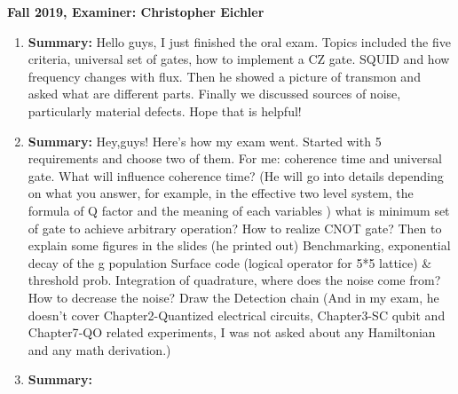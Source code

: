 \documentclass{article}%
\begin{document}
\newpage%
\begin{center}%
\begin{large}%
\textbf{Fall 2019, Examiner: Christopher Eichler}%
\end{large}%
\end{center}%
\begin{enumerate}%
\item%
\begin{mycolorbox}%
\textbf{Summary:}%
\newline%
Hello guys, I just finished the oral exam. Topics included the five criteria, universal set of gates, how to implement a CZ gate. SQUID and how frequency changes with flux. Then he showed a picture of transmon and asked what are different parts. Finally we discussed sources of noise, particularly material defects. Hope that is helpful!%
\end{mycolorbox}%
\item%
\textbf{Summary:}%
\newline%
Hey,guys! Here's how my exam went.\newline%
Started with 5 requirements and choose two of them.\newline%
For me: coherence time and universal gate.\newline%
What will influence coherence time? (He will go into details depending on what you answer, for example, in the effective two level system, the formula of Q factor and the meaning of each variables )\newline%
what is minimum set of gate to achieve arbitrary operation? \newline%
How to realize CNOT gate? \newline%
Then to explain some figures in the slides (he printed out)\newline%
Benchmarking, exponential decay of the g population\newline%
Surface code (logical operator for 5*5 lattice) \& threshold prob.\newline%
Integration of quadrature, where does the noise come from? How to decrease the noise? Draw the Detection chain\newline%
(And in my exam, he doesn't cover Chapter2{-}Quantized electrical circuits, Chapter3{-}SC qubit and Chapter7{-}QO related experiments, I was not asked about any Hamiltonian and any math derivation.)%
\item%
\begin{mycolorbox}%
\textbf{Summary:}%
\newline%

\end{mycolorbox}
\end{enumerate}
\end{document}

